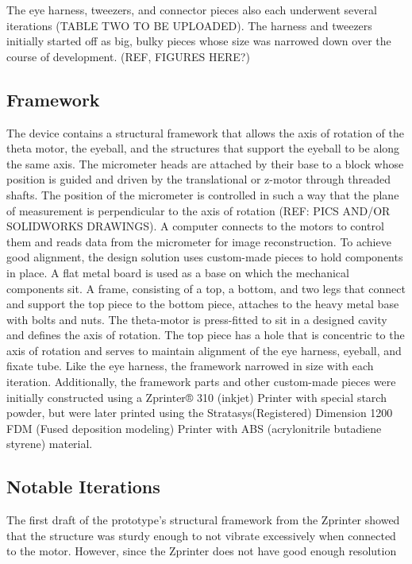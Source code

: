 \documentclass{article}
\begin{document}
The eye harness, tweezers, and connector pieces also each underwent several iterations (TABLE TWO TO BE UPLOADED). The harness and tweezers initially started off as big, bulky pieces whose size was narrowed down over the course of development. (REF, FIGURES HERE?)

\subsection{Framework}
\label{sec:frame}
	The device contains a structural framework that allows the axis of rotation of the theta motor, the eyeball, and the structures that support the eyeball to be along the same axis. The micrometer heads are attached by their base to a block whose position is guided and driven by the translational or z-motor through threaded shafts. The position of the micrometer is controlled in such a way that the plane of measurement is perpendicular to the axis of rotation (REF: PICS AND/OR SOLIDWORKS DRAWINGS). A computer connects to the motors to control them and reads data from the micrometer for image 
reconstruction. 
To achieve good alignment, the design solution uses custom-made pieces to hold components in place. A flat metal board is used as a base on which the mechanical components sit. A frame, consisting of a top, a bottom, and two legs that connect and support the top piece to the bottom piece, attaches to the heavy metal base with bolts and nuts. The theta-motor is press-fitted to sit in a designed cavity and defines the axis of rotation. The top piece has a hole that is concentric to the axis of rotation and serves to maintain alignment of the eye harness, eyeball, and fixate tube. 
	Like the eye harness, the framework narrowed in size with each iteration. Additionally, the framework parts and other custom-made pieces were initially constructed using a  Zprinter® 310 (inkjet) Printer with special starch powder, but were later printed using the Stratasys(Registered) Dimension 1200 FDM (Fused deposition modeling) Printer with ABS (acrylonitrile butadiene styrene) material. 

\subsection{Notable Iterations}
\label{sec:iterations}

The first draft of the prototype’s structural framework from the Zprinter showed that the structure was sturdy enough to not vibrate excessively when connected to the motor. However, since the Zprinter does not have good enough resolution for tight connections and precise positioning of parts, the FDM Printer was chosen to print the structures for later iterations. The second draft of the framework used the same blueprint as the initial draft but was printed with the FDM printer, resulting in a framework that is lighter, more precise, and allowed better fitting between parts. Like the z-printed model, it is also strong and does not vibrate much. 
	The first z-motor was was 0.6 amperes mounted on a modified microscope stage. It did not have enough power to drive the micrometer and was switched with a 2 ampere stepper motor on syringe pump.
\end{document}
